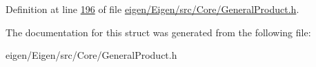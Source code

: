 Definition at line \hyperlink{eigen_2_eigen_2src_2_core_2_general_product_8h_source_l00196}{196} of file \hyperlink{eigen_2_eigen_2src_2_core_2_general_product_8h_source}{eigen/\+Eigen/src/\+Core/\+General\+Product.\+h}.



The documentation for this struct was generated from the following file\+:\begin{DoxyCompactItemize}
\item 
eigen/\+Eigen/src/\+Core/\+General\+Product.\+h\end{DoxyCompactItemize}
